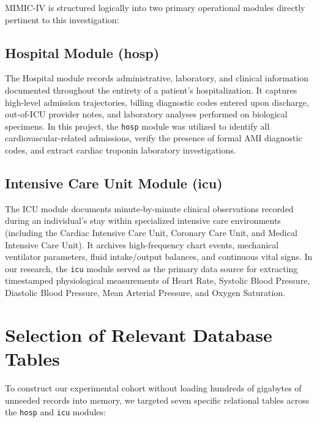 MIMIC-IV is structured logically into two primary operational modules directly pertinent to this investigation:

\subsection{Hospital Module (hosp)}
\label{subsec:hosp_module}
The Hospital module records administrative, laboratory, and clinical information documented throughout the entirety of a patient's hospitalization. It captures high-level admission trajectories, billing diagnostic codes entered upon discharge, out-of-ICU provider notes, and laboratory analyses performed on biological specimens. In this project, the \texttt{hosp} module was utilized to identify all cardiovascular-related admissions, verify the presence of formal AMI diagnostic codes, and extract cardiac troponin laboratory investigations.

\subsection{Intensive Care Unit Module (icu)}
\label{subsec:icu_module}
The ICU module documents minute-by-minute clinical observations recorded during an individual's stay within specialized intensive care environments (including the Cardiac Intensive Care Unit, Coronary Care Unit, and Medical Intensive Care Unit). It archives high-frequency chart events, mechanical ventilator parameters, fluid intake/output balances, and continuous vital signs. In our research, the \texttt{icu} module served as the primary data source for extracting timestamped physiological measurements of Heart Rate, Systolic Blood Pressure, Diastolic Blood Pressure, Mean Arterial Pressure, and Oxygen Saturation.

\section{Selection of Relevant Database Tables}
\label{sec:table_selection}

To construct our experimental cohort without loading hundreds of gigabytes of unneeded records into memory, we targeted seven specific relational tables across the \texttt{hosp} and \texttt{icu} modules:

